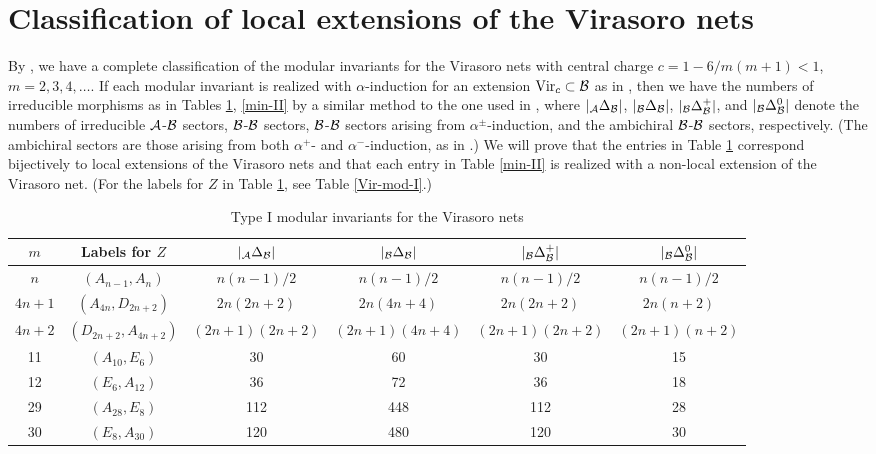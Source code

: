 \documentclass[12pt]{article}
\def\Vir{{\rm Vir}}
\def\a{\alpha}
\def\N{{\cal A}}
\def\M{{\cal B}}
\begin{document}
\section{Classification of local extensions of the Virasoro nets}
\label{class-ext-Virasoro}

By \cite{CIZ}, we have a complete classification of the modular invariants
for the Virasoro nets with
central charge $c=1-6/m(m+1)<1$, $m=2,3,4,\dots$.
If each modular invariant is realized with $\a$-induction
for an extension $\Vir_c\subset \M$ as in \cite[Corollary 5.8]{BEK1},
then we  have the numbers of
irreducible morphisms as in Tables \ref{min-I}, \ref{min-II} by
a similar method to the one used in \cite[Table 1, page 774]{BEK2},
where $|{}_\N \Delta_\M|$, $|{}_\M \Delta_\M|$,
$|{}_\M \Delta^+_\M|$, and $|{}_\M \Delta^0_\M|$ denote the numbers
of irreducible $\N$-$\M$ sectors, $\M$-$\M$ sectors, $\M$-$\M$ sectors
arising from $\a^\pm$-induction, and the ambichiral $\M$-$\M$ sectors,
respectively.  (The ambichiral sectors are those arising from both
$\a^+$- and $\a^-$-induction, as in \cite[page 741]{BEK2}.)
We will prove that the entries in Table \ref{min-I} correspond bijectively
to local extensions of the Virasoro nets and that each entry
in Table \ref{min-II} is realized with a non-local extension of
the Virasoro net.  (For the labels for $Z$ in Table \ref{min-I},
see Table \ref{Vir-mod-I}.)

\begin{table}[htbp]
\begin{center}{\footnotesize
\begin{tabular}{|c|c|c|c|c|c|}\hline
$m$ & Labels for $Z$ & $|{}_\N \Delta_\M|$ & $|{}_\M \Delta_\M|$
& $|{}_\M \Delta^+_\M|$ & $|{}_\M \Delta^0_\M|$ \\ \hline
$n$ & $(A_{n-1},A_n)$ & $n(n-1)/2$
& $n(n-1)/2$ & $n(n-1)/2$ & $n(n-1)/2$ \\ \hline
$4n+1$ & $(A_{4n},D_{2n+2})$ & $2n(2n+2)$
& $2n(4n+4)$ & $2n(2n+2)$ & $2n(n+2)$ \\ \hline
$4n+2$ & $(D_{2n+2},A_{4n+2})$ & $(2n+1)(2n+2)$
& $(2n+1)(4n+4)$ & $(2n+1)(2n+2)$ & $(2n+1)(n+2)$ \\ \hline
11  & $(A_{10},E_6)$ & 30 & 60 & 30 & 15  \\ \hline
12  & $(E_6, A_{12})$ & 36 & 72 & 36 & 18  \\ \hline
29  & $(A_{28},E_8)$ & 112 & 448 & 112 & 28  \\ \hline
30  & $(E_8, A_{30})$ & 120 & 480 & 120 & 30  \\ \hline
\end{tabular}}
\caption{Type I modular invariants for the Virasoro nets}
\label{min-I}
\end{center}
\end{table}
\end{document}
